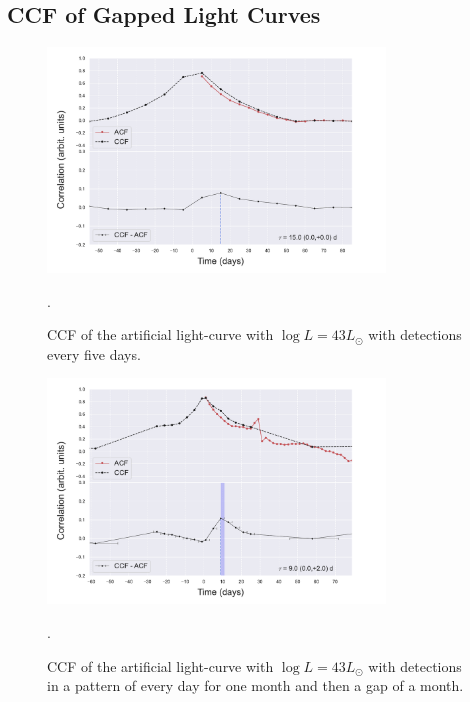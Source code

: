 \documentclass[letterpaper, oneside]{article}
\begin{document}
\subsection{CCF of Gapped Light Curves}

\begin{figure}[h]
	\centering
	\includegraphics[width=0.8\textwidth]{../CCF_plots/artificial_x_y_5days.pdf}
	\caption{CCF of the artificial light-curve with $\log L = 43 L_{\odot}$ with detections every five days.}.
	\label{fig:ccf_art_lc_L43_5days}
\end{figure}

\begin{figure}[h]
	\centering
	\includegraphics[width=0.8\textwidth]{../CCF_plots/artificial_x_y_month.pdf}
	\caption{CCF of the artificial light-curve with $\log L = 43 L_{\odot}$ with detections in a pattern of every day for one month and then a gap of a month.}.
	\label{fig:ccf_art_lc_L43_month}
\end{figure}
\end{document}
